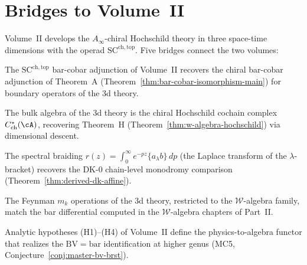\section{Bridges to Volume~II}
\label{sec:cross-volume-bridges}

Volume~II develops the $A_\infty$-chiral Hochschild theory in
three space-time dimensions with the operad
$\mathrm{SC}^{\mathrm{ch,top}}$.  Five bridges connect the two
volumes:

\begin{conjecture}
\label{conj:vol2-bar-cobar-bridge}
The $\mathrm{SC}^{\mathrm{ch,top}}$ bar-cobar adjunction of
Volume~II recovers the chiral bar-cobar adjunction of Theorem~A
(Theorem~\ref{thm:bar-cobar-isomorphism-main}) for boundary
operators of the 3d theory.
\end{conjecture}

\begin{conjecture}
\label{conj:vol2-hochschild-bridge}
The bulk algebra of the 3d theory is the chiral Hochschild cochain
complex $C^*_{\mathrm{ch}}(\cA)$, recovering Theorem~H
(Theorem~\ref{thm:w-algebra-hochschild}) via dimensional
descent.
\end{conjecture}

\begin{conjecture}
\label{conj:vol2-dk-ybe-bridge}
The spectral braiding $r(z) = \int_0^\infty e^{-pz}
\{a_\lambda b\}\,dp$ (the Laplace transform of the
$\lambda$-bracket) recovers the DK-0 chain-level
monodromy comparison (Theorem~\ref{thm:derived-dk-affine}).
\end{conjecture}

\begin{conjecture}
\label{conj:vol2-w-algebra-bridge}
The Feynman $m_k$ operations of the 3d theory, restricted to
the $\mathcal{W}$-algebra family, match the bar differential computed in the
$\mathcal{W}$-algebra chapters of Part~II.
\end{conjecture}

\begin{conjecture}
\label{conj:vol2-bv-functor-bridge}
Analytic hypotheses (H1)--(H4) of Volume~II define the
physics-to-algebra functor that realizes the
$\mathrm{BV} = \mathrm{bar}$ identification at higher
genus (MC5, Conjecture~\ref{conj:master-bv-brst}).
\end{conjecture}


